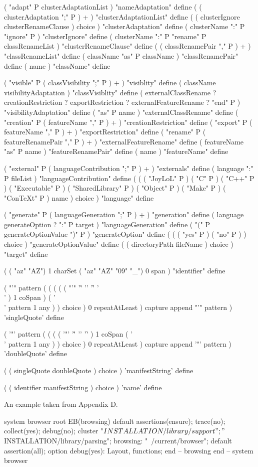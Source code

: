 ( "adapt" P clusterAdaptationList ) "nameAdaptation" define
( ( clusterAdaptation ";" P ) + ) "clusterAdaptationList" define
( ( clusterIgnore clusterRenameClause ) choice ) "clusterAdaptation" define
( clusterName ":" P "ignore" P ) "clusterIgnore" define
( clusterName ":" P "rename" P classRenameList ) "clusterRenameClause" define
( ( classRenamePair "," P ) + ) "classRenameList" define
( className "as" P className ) "classRenamePair" define
( name ) "className" define

( "visible" P ( classVisibility ";" P ) + ) "visiblity" define
( className visibilityAdaptation ) "classVisiblity" define
(
  externalClassRename ?
  creationRestriction ?
  exportRestriction ?
  externalFeatureRename ?
  "end" P 
) "visibilityAdaptation" define
( "as" P name ) "externalClassRename" define
( "creation" P ( featureName "," P ) + ) "creationRestriction" define
( "export" P ( featureName "," P ) + ) "exportRestriction" define
( "rename" P ( featureRenamePair "," P ) + ) "externalFeatureRename" define
( featureName "as" P name ) "featureRenamePair" define
( name ) "featureName" define

( "external" P ( languageContribution ";" P ) + ) "externals" define
( language ":" P fileList ) "languageContribution" define
(
  (
    ( "JoyLoL" P )
    ( "C" P )
    ( "C++" P )
    ( "Executable" P )
    ( "SharedLibrary" P )
    ( "Object" P )
    ( "Make" P )
    ( "ConTeXt" P )
    name
  ) choice
) "language" define

( "generate" P ( languageGeneration ";" P ) + ) "generation" define
( language generateOption ? ":" P target ) "languageGeneration" define
( "(" P generateOptionValue ")" P ) "generateOption" define
(
  (
    ( "yes" P )
    ( "no" P )
  ) choice
) "generateOptionValue" define
( ( directoryPath fileName ) choice ) "target" define

(
  ( "az" "AZ") 1 charSet
  ( "az" "AZ" "09" "_") 0 span
) "identifier" define

(
  "'" pattern
  (
    ( 
      (
        ( ( "'" '\r' '\n' '\f' '\\' ) 1 coSpan )
        ( '\\' pattern 1 any )
      ) choice
    ) 0 repeatAtLeast
  ) capture append
  "'" pattern
) 'singleQuote' define

(
  '"' pattern
  (
    ( 
      (
        ( '"' '\r' '\n' '\f' ) 1 coSpan
        ( '\\' pattern 1 any )
      ) choice
    ) 0 repeatAtLeast
  ) capture append
  '"' pattern
) 'doubleQuote' define

(
  ( singleQuote doubleQuote ) choice
) 'manifestString' define

(
  ( identifier manifestString ) choice
) 'name' define
\stopJoylolCode

An example taken from \cite{meyer1992eiffelTheLanguage} Appendix D.

\starttyping
system browser root
  EB(browsing)
default
  assertions(ensure); 
  trace(no);
  collect(yes);
  debug(no);
cluster
  "$INSTALLATION/library/support";
  "$INSTALLATION/library/parsing";
  browsing: "~/current/browser";
  default
    assertion(all);
  option
    debug(yes): Layout, functions;
  end -- browsing
end -- system browser
\stoptyping
